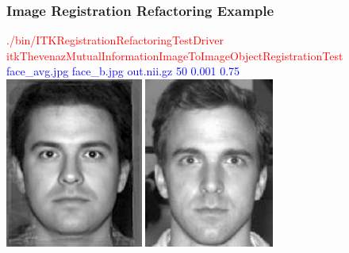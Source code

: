 \begin{frame}
\frametitle{Image Registration Refactoring Example}
\textcolor{red}{./bin/ITKRegistrationRefactoringTestDriver itkThevenazMutualInformationImageToImageObjectRegistrationTest }\\
\textcolor{blue}{face\_avg.jpg face\_b.jpg out.nii.gz  50 0.001 0.75 }\\
\includegraphics[height=2.2in]{../Art/face_avg.jpg}
\includegraphics[height=2.2in]{../Art/face_b.jpg}
\end{frame}

